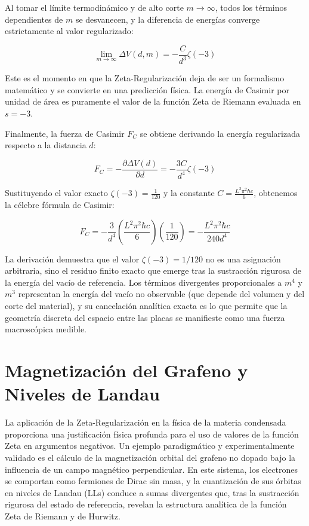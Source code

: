 Al tomar el límite termodinámico y de alto corte $m \to \infty$, todos los términos dependientes de $m$ se desvanecen, y la diferencia de energías converge estrictamente al valor regularizado:

$$ \lim_{m \to \infty} \Delta V(d, m) = - \frac{C}{d^3} \zeta(-3) $$

Este es el momento en que la Zeta-Regularización deja de ser un formalismo matemático y se convierte en una predicción física. La energía de Casimir por unidad de área es puramente el valor de la función Zeta de Riemann evaluada en $s = -3$.

Finalmente, la fuerza de Casimir $F_C$ se obtiene derivando la energía regularizada respecto a la distancia $d$:

$$ F_C = - \frac{\partial \Delta V(d)}{\partial d} = - \frac{3C}{d^4} \zeta(-3) $$

Sustituyendo el valor exacto $\zeta(-3) = \frac{1}{120}$ y la constante $C = \frac{L^2 \pi^2 \hbar c}{6}$, obtenemos la célebre fórmula de Casimir:

$$ F_C = - \frac{3}{d^4} \left( \frac{L^2 \pi^2 \hbar c}{6} \right) \left( \frac{1}{120} \right) = - \frac{L^2 \pi^2 \hbar c}{240 d^4} $$

La derivación demuestra que el valor $\zeta(-3) = 1/120$ no es una asignación arbitraria, sino el residuo finito exacto que emerge tras la sustracción rigurosa de la energía del vacío de referencia. Los términos divergentes proporcionales a $m^4$ y $m^3$ representan la energía del vacío no observable (que depende del volumen y del corte del material), y su cancelación analítica exacta es lo que permite que la geometría discreta del espacio entre las placas se manifieste como una fuerza macroscópica medible.


\section{Magnetización del Grafeno y Niveles de Landau}

La aplicación de la Zeta-Regularización en la física de la materia condensada proporciona una justificación física profunda para el uso de valores de la función Zeta en argumentos negativos. Un ejemplo paradigmático y experimentalmente validado es el cálculo de la magnetización orbital del grafeno no dopado bajo la influencia de un campo magnético perpendicular. En este sistema, los electrones se comportan como fermiones de Dirac sin masa, y la cuantización de sus órbitas en niveles de Landau (LLs) conduce a sumas divergentes que, tras la sustracción rigurosa del estado de referencia, revelan la estructura analítica de la función Zeta de Riemann y de Hurwitz.

